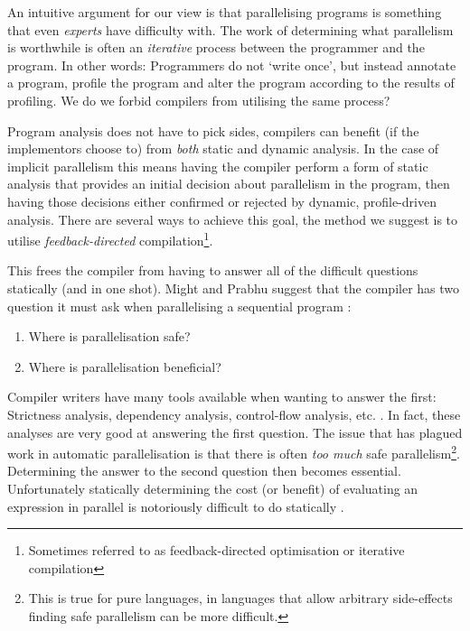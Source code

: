 An intuitive argument for our view is that parallelising programs is something
that even \emph{experts} have difficulty with. The work of determining what
parallelism is worthwhile is often an \emph{iterative} process between the
programmer and the program. In other words: Programmers do not `write once',
but instead annotate a program, profile the program and alter the program
according to the results of profiling. We do we forbid compilers from utilising
the same process?

Program analysis does not have to pick sides, compilers can benefit (if the
implementors choose to) from \emph{both} static and dynamic analysis. In the
case of implicit parallelism this means having the compiler perform a form of
static analysis that provides an initial decision about parallelism in the
program, then having those decisions either confirmed or rejected by dynamic,
profile-driven analysis. There are several ways to achieve this goal, the
method we suggest is to utilise \emph{feedback-directed}
compilation\footnote{Sometimes referred to as feedback-directed optimisation or
iterative compilation}.


This frees the compiler from having to answer all of the difficult questions
statically (and in one shot). Might and Prabhu suggest that the compiler has
two question it must ask when parallelising a sequential program :

\begin{enumerate}
    \item Where is parallelisation safe?
    \item Where is parallelisation beneficial?
\end{enumerate}

Compiler writers have many tools available when wanting to answer the first:
Strictness analysis, dependency analysis, control-flow analysis, etc.
\citep{hogen1992automatic, might2009interprocedural}. In fact, these analyses
are very good at answering the first question. The issue that has plagued work
in automatic parallelisation is that there is often \emph{too much} safe
parallelism\footnote{This is true for pure languages, in languages that allow
arbitrary side-effects finding safe parallelism can be more difficult.}.
Determining the answer to the second question then becomes essential.
Unfortunately statically determining the cost (or benefit) of evaluating an
expression in parallel is notoriously difficult to do statically
\citep{hogen1992automatic, might2009interprocedural}.


